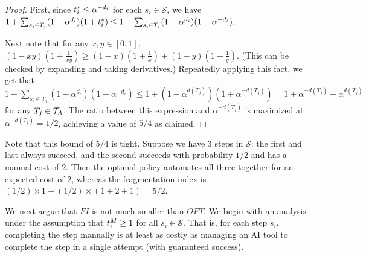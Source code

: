 \begin{proof}
First, since $t^*_{i} \leq \alpha^{-d_i}$ for each $s_i \in \mathcal{S}$, we have 
$1 + \sum_{s_i \in T_j}(1-\alpha^{d_i})(1+t^*_{i}) \leq 1 + \sum_{s_i \in T_j}(1-\alpha^{d_i})(1+\alpha^{-d_i})$.

Next note that for any $x,y\in [0,1]$, $(1-xy)(1+\tfrac{1}{xy}) \geq (1-x)(1+\tfrac{1}{x}) + (1-y)(1+\tfrac{1}{y})$.  
(This can be checked by expanding and taking derivatives.)  
Repeatedly applying this fact, we get that $1 + \sum_{s_i \in T_j}(1-\alpha^{d_i})(1+\alpha^{-d_i}) \leq 1 + (1-\alpha^{d(T_j)})(1+\alpha^{-d(T_j)}) = 1 + \alpha^{-d(T_j)} - \alpha^{d(T_j)}$ for any $T_j \in \mathcal{T}_{A}$.  
The ratio between this expression and $\alpha^{-d(T_j)}$ is maximized at $\alpha^{-d(T_j)} = 1/2$, achieving a value of $5/4$ as claimed.
\end{proof}

Note that this bound of $5/4$ is tight.  
Suppose we have 3 steps in $\mathcal{S}$: the first and last always succeed, and the second succeeds with probability $1/2$ and has a manual cost of $2$.
Then the optimal policy automates all three together for an expected cost of $2$, whereas the fragmentation index is $(1/2)\times 1 + (1/2) \times (1+2+1) = 5/2$.

\medskip

We next argue that $FI$ is not much smaller than $OPT$.  
We begin with an analysis under the assumption that $t^{M}_{i} \geq 1$ for all $s_i \in \mathcal{S}$.  
That is, for each step $s_i$, completing the step manually is at least as costly as managing an AI tool to complete the step in a single attempt (with guaranteed success).

